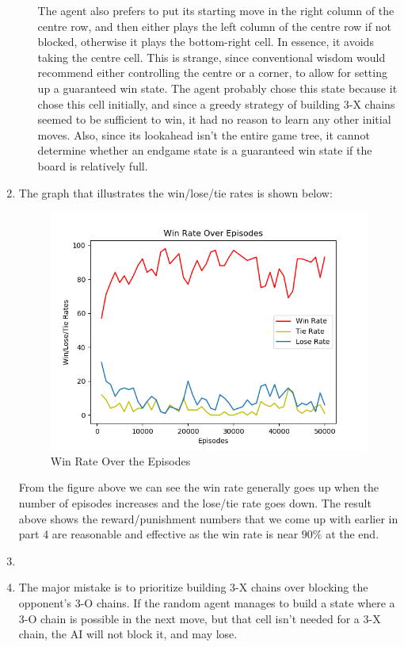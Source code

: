 \documentclass[10pt,letterpaper]{article}
\begin{document}
\begin{enumerate}
\begin{enumerate}
			The agent also prefers to put its starting move in the right column of the centre row, and then either plays the left column of the centre row if not blocked, otherwise it plays the bottom-right cell.
			In essence, it avoids taking the centre cell.
			This is strange, since conventional wisdom would recommend either controlling the centre or a corner, to allow for setting up a guaranteed win state.
			The agent probably chose this state because it chose this cell initially, and since a greedy strategy of building 3-X chains seemed to be sufficient to win, it had no reason to learn any other initial moves.
			Also, since its lookahead isn't the entire game tree, it cannot determine whether an endgame state is a guaranteed win state if the board is relatively full.
		\end{enumerate}
		\item %
		The graph that illustrates the win/lose/tie rates is shown below:

		\begin{figure}[H]
				\centering
				\includegraphics[width=0.7\linewidth]{Part6LearningCurve.png}
				\caption{Win Rate Over the Episodes}
				\label{fig:part6}
		\end{figure}

		From the figure above we can see the win rate generally goes up when the number of episodes increases and the lose/tie rate goes down. The result above shows the reward/punishment numbers that we come up with earlier in part 4 are reasonable and effective as the win rate is near $90\%$ at the end.

		\item %
		\item %
		The major mistake is to prioritize building 3-X chains over blocking the opponent's 3-O chains. 
		If the random agent manages to build a state where a 3-O chain is possible in the next move, but that cell isn't needed for a 3-X chain, the AI will not block it, and may lose.
		

\end{enumerate}
\end{document}
